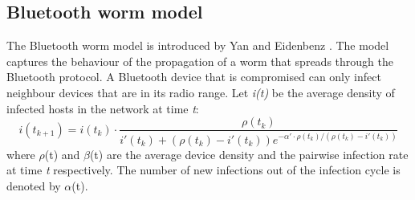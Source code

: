 %


\subsection{Bluetooth worm model}

The Bluetooth worm model is introduced by Yan and Eidenbenz \citep{yan2009modeling}. The model captures the behaviour of the propagation of a worm that spreads through the Bluetooth protocol. 
A Bluetooth device that is compromised can only infect neighbour devices that are in its radio range.
Let \textit{i(t)} be the average density of infected hosts in the network at time \textit{t}: 
\begin{equation}
i(t_{k+1})=i(t_{k}) \cdot \dfrac{\rho(t_{k})}{i'(t_{k}) + (\rho(t_{k}) - i'(t_{k}))e^{-\alpha' \cdot \rho(t_{k}) / (\rho(t_{k}) - i'(t_{k}))}}
\end{equation}
where $\rho$(t) and $\beta$(t) are the average device density and the pairwise infection rate at time \textit{t} respectively. The number of new infections out of the infection cycle is denoted by $\alpha$(t).\\

